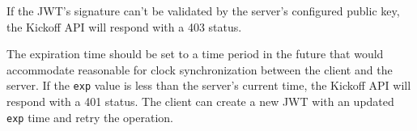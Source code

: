 If the JWT's signature can't be validated by the \cxoneflow server's configured public key, the Kickoff API will
respond with a 403 status.

The expiration time should be set to a time period in the future that would accommodate reasonable
 for clock synchronization between the client and the
\cxoneflow server.  If the \texttt{exp} value is less than the \cxoneflow server's current time,
the Kickoff API will respond with a 401 status.  The client can create a new JWT with an updated \texttt{exp}
time and retry the operation.






